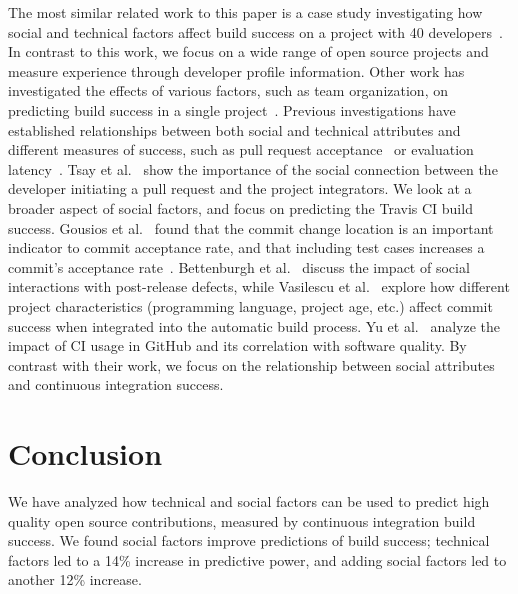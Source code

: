 \documentclass[10pt, conference]{IEEEtran}
\begin{document}
The most similar related work to this paper is a case study investigating how
social and technical factors affect build
success on a project with 40 developers~\cite{Hassan06}.
In contrast to this work, we focus on a wide range of open source projects and
measure experience through developer profile information.
Other work has investigated the effects of various factors, such as team
organization, on predicting build success in a single
project~\cite{Kwan11,Wolf09}.
Previous investigations have established relationships between both social and 
technical 
attributes and 
different measures of success, such as pull request acceptance~\cite{gousios14, 
gousios15,tsay14icse,tsay14fse} or evaluation latency~\cite{Yu15}.
Tsay et al.~\cite{tsay14icse} 
show the importance of the social connection between the developer initiating a
pull request and the project integrators. We look at a broader aspect of 
social factors, and focus on predicting the Travis CI build success.
Gousios et al.~\cite{gousios14} found that the commit change location is
an important indicator to commit acceptance rate, and that including
test cases increases a
commit's acceptance rate~\cite{gousios15}.
Bettenburgh et 
al.~\cite{bettenburgh10} discuss the impact of social interactions with 
post-release defects, while Vasilescu et al.~\cite{vasilescu14} explore how different 
project characteristics (programming language, project age, etc.) affect commit 
success when integrated into the automatic build process. Yu et al.~\cite{yu16} 
analyze the impact of CI usage in GitHub and its correlation with software 
quality. By contrast with their work, we focus on the relationship between social 
attributes and continuous integration success. 

\section{Conclusion}

We have analyzed how technical and social factors can be used to
predict high quality open source contributions, measured by continuous
integration build success.  We found social factors improve predictions of build 
success; technical factors led to a 14\% increase in predictive power, and 
adding social factors led to another 12\% increase. 
\end{document}
